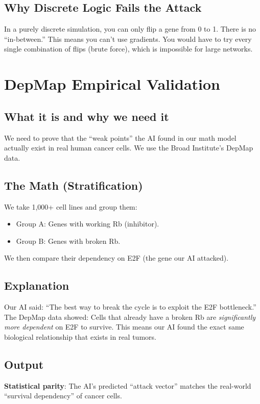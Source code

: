 \documentclass[11pt,a4paper]{article}
\begin{document}
\subsection*{Why Discrete Logic Fails the Attack}
In a purely discrete simulation, you can only flip a gene from 0 to 1. There is no ``in-between.'' This means you can't use gradients. You would have to try every single combination of flips (brute force), which is impossible for large networks.

\section{DepMap Empirical Validation}

\subsection*{What it is and why we need it}
We need to prove that the ``weak points'' the AI found in our math model actually exist in real human cancer cells. We use the Broad Institute's DepMap data.

\subsection*{The Math (Stratification)}
We take 1,000+ cell lines and group them:
\begin{itemize}
    \item Group A: Genes with working Rb (inhibitor).
    \item Group B: Genes with broken Rb.
\end{itemize}
We then compare their dependency on E2F (the gene our AI attacked).

\subsection*{Explanation}
Our AI said: ``The best way to break the cycle is to exploit the E2F bottleneck.'' 
The DepMap data showed: Cells that already have a broken Rb are \textit{significantly more dependent} on E2F to survive. This means our AI found the exact same biological relationship that exists in real tumors.

\subsection*{Output}
\textbf{Statistical parity}: The AI's predicted ``attack vector'' matches the real-world ``survival dependency'' of cancer cells.
\end{document}
